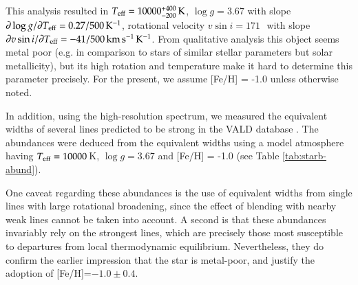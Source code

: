 This analysis resulted in $T_{\rm eff} = 10000^{+ 400}_{-200}\,\rm{K}$, $\log{g} = 3.67$ with slope  $\partial \log{g}/\partial T_{\rm eff} = 0.27/500 \,\rm{K}^{-1}$, rotational velocity $v\sin{i} = 171$\,\kms\ with slope $\partial v\sin{i}/\partial T_{\rm eff} = -41/500\,\rm{km\,s^{-1}\,K^{-1}}$. From qualitative analysis this object seems metal poor (e.g. in comparison to stars of similar stellar parameters but solar metallicity), but its high rotation and temperature make it hard to determine this parameter precisely. For the present, we assume [Fe/H] = -1.0 unless otherwise noted.

In addition, using the high-resolution spectrum, we measured the equivalent widths of several lines predicted to be strong in the VALD database \citep{2000BaltA...9..590K}. The abundances were deduced from the equivalent widths using a model atmosphere having $T_{\rm eff} = 10000$\,K, $\log{g}=3.67$ and [Fe/H] = -1.0 (see Table \ref{tab:starb-abund}).

One caveat regarding these abundances is the use of equivalent widths from 
single lines with large rotational broadening, since the effect of blending 
with nearby weak lines cannot be taken into account. A second is that these 
abundances invariably rely on the strongest lines, which are precisely those 
most susceptible to departures from local thermodynamic equilibrium. 
Nevertheless, they do confirm the earlier impression that the star is 
metal-poor, and justify the adoption of [Fe/H]=$-1.0 \pm 0.4$.



